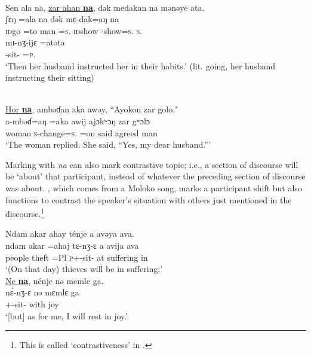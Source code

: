  
\ea \label{ex:11:36}
\\
Sen  ala  na,  \underline{zar  ahan \textbf{na}},  dək  medakan  na  mənəye  ata.  \\
\gll  ʃɛŋ     =ala   na              dək    mɛ-dak=aŋ na\\ 
      \textsc{id}go   =to  {\PSP}  man    =\textsc{s}.{\POSS}    {\PSP}      \textsc{id}show   {\NOM}-show=\textsc{s}.{\IO}   \textsc{s}.{\DO}\\   
      
      \medskip
\gll  mɪ-nʒ-ijɛ     =atəta\\
      {\NOM}{}-sit-{\CL}   =\textsc{p}.{\POSS}\\
\glt  ‘Then her husband instructed her in their habits.’  (lit. going, her husband instructing their sitting)    
\z

\ea \label{ex:11:37}
\\
\underline{Hor  \textbf{na}},  ambəɗan  aka  awəy, “Ayokon  zar  golo."\\
\gll  {}    a-mbəɗ=aŋ        =aka       awij    ajɔkʷɔŋ  zar  gʷɔlɔ\\
      woman {\PSP}  \textsc{s}-change=\textsc{s}.{\IO}    =on      said  agreed   man  {\VOC}\\
\glt  ‘The woman replied. She said, “Yes, my dear husband.”’
\z

Marking with \textit{na} can also mark contrastive topic; i.e., a section of discourse will be ‘about’ that participant, instead of whatever the preceding section of discourse was about. , which comes from a Moloko song, marks a participant shift but also functions to contrast the speaker’s situation with others just mentioned in the discourse.\footnote{This is called ‘contrastiveness’ in \citet{Chafe1976}.} 

\ea \label{ex:11:38}
Ndam  akar  ahay  ténje  a  avəya  ava.\\  
\gll  ndam akar  =ahaj  tɛ-nʒ{}-ɛ    a  avija    ava \\ 
      people  theft  =Pl  \textsc{p}+{\IFV}-sit-{\CL}  at  suffering  in\\ 
      \glt ‘(On that day) thieves will be in suffering;’\\
      
      \medskip
\underline{Ne  \textbf{na}},  nénje  nə  memle  ga.\\
\gll {}  n\'ɛ-nʒ{}-ɛ     nə  mɛmlɛ   ga\\
     {\oneS} {\PSP} {\oneS}+{\IFV}-sit-{\CL}  with  joy  {\ADJ}\\
\glt  ‘[but] as for me, I will rest in joy.’
\z

